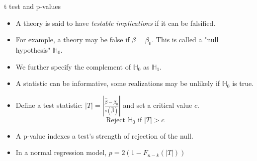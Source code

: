 \documentclass[aspectratio=169, handout, t]{beamer}
\numberwithin{equation}{section}
\begin{document}
\begin{frame}{t test and p-values}
\begin{itemize}
\item  A theory is said to have \emph{testable implications} if it can be falsified. \pause
\item For example, a theory may be false if $\beta=\beta_0$.  This is called a "null hypothesis" $\mathbb{H}_0$. \pause
\item We further specify the complement of $\mathbb{H}_0$ as $\mathbb{H}_1$. \pause
\item A statistic can be informative, some realizations may be unlikely if $\mathbb{H}_0$ is true. \pause
\item Define a test statistic: $|T|=\left| \frac{\hat{\beta}-\beta_0}{s(\hat{\beta})}\right|$ and set a critical value $c$.
$$\text{Reject }\mathbb{H}_0\text{ if } |T|>c$$ 
\item A p-value indexes a test's strength of rejection of the null. \pause
\item In a normal regression model, $p=2(1-F_{n-k}(|T|))$ 
\end{itemize}
\end{frame}
\end{document}
